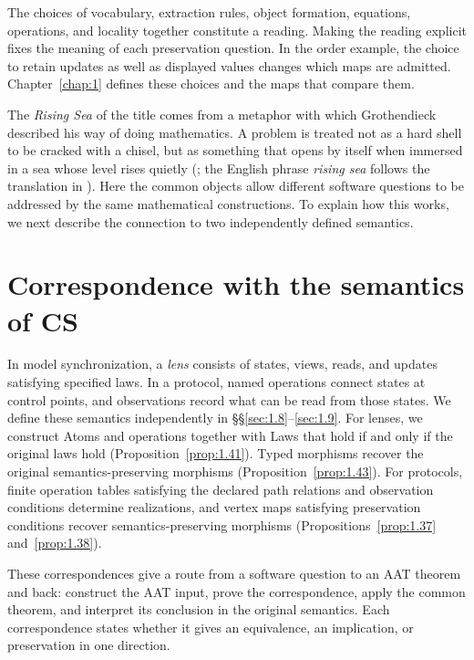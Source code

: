 The choices of vocabulary, extraction rules, object formation, equations,
operations, and locality together constitute a reading. Making the reading
explicit fixes the meaning of each preservation question. In the order
example, the choice to retain updates as well as displayed values changes
which maps are admitted. Chapter~\ref{chap:1} defines these choices and the
maps that compare them.

The \emph{Rising Sea} of the title comes from a metaphor with which
Grothendieck described his way of doing mathematics. A problem is treated not
as a hard shell to be cracked with a chisel, but as something that opens by
itself when immersed in a sea whose level rises quietly
(\cite[\href{https://webusers.imj-prg.fr/~leila.schneps/grothendieckcircle/RetSbis.pdf}{Part~III, note~122, ``La mer qui monte\ldots''}]{ReS};
the English phrase \emph{rising sea} follows the translation in
\cite{McLarty03}). Here the common objects allow different software questions
to be addressed by the same mathematical constructions. To explain how this
works, we next describe the connection to two independently defined semantics.

\section*{Correspondence with the semantics of CS}

In model synchronization, a \emph{lens} consists of states, views, reads, and
updates satisfying specified laws. In a protocol, named operations connect
states at control points, and observations record what can be read from those
states. We define these semantics independently in \S\S\ref{sec:1.8}--\ref{sec:1.9}.
For lenses, we construct Atoms and operations together with Laws that hold
if and only if the original laws hold (Proposition~\ref{prop:1.41}). Typed
morphisms recover the original semantics-preserving morphisms
(Proposition~\ref{prop:1.43}). For protocols, finite operation tables satisfying the declared path relations
and observation conditions determine realizations, and vertex maps satisfying
preservation conditions recover
semantics-preserving morphisms (Propositions~\ref{prop:1.37}
and~\ref{prop:1.38}).

These correspondences give a route from a software question to an AAT theorem
and back: construct the AAT input, prove the correspondence, apply the common
theorem, and interpret its conclusion in the original semantics. Each
correspondence states whether it gives an equivalence, an implication, or
preservation in one direction.

